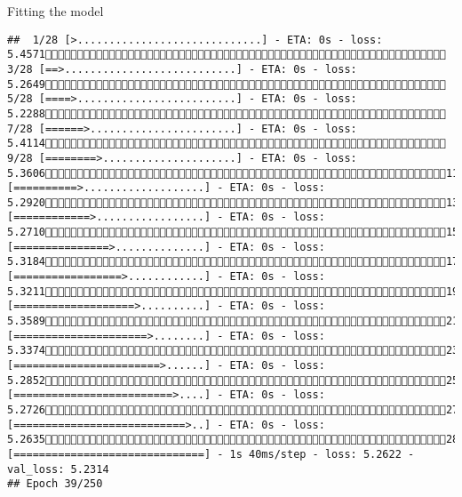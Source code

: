 \documentclass[
  ignorenonframetext,
]{beamer}
\begin{document}
\begin{frame}[fragile]{Fitting the model}
\begin{verbatim}
##  1/28 [>.............................] - ETA: 0s - loss: 5.4571 3/28 [==>...........................] - ETA: 0s - loss: 5.2649 5/28 [====>.........................] - ETA: 0s - loss: 5.2288 7/28 [======>.......................] - ETA: 0s - loss: 5.4114 9/28 [========>.....................] - ETA: 0s - loss: 5.360611/28 [==========>...................] - ETA: 0s - loss: 5.292013/28 [============>.................] - ETA: 0s - loss: 5.271015/28 [===============>..............] - ETA: 0s - loss: 5.318417/28 [=================>............] - ETA: 0s - loss: 5.321119/28 [===================>..........] - ETA: 0s - loss: 5.358921/28 [=====================>........] - ETA: 0s - loss: 5.337423/28 [=======================>......] - ETA: 0s - loss: 5.285225/28 [=========================>....] - ETA: 0s - loss: 5.272627/28 [===========================>..] - ETA: 0s - loss: 5.263528/28 [==============================] - 1s 40ms/step - loss: 5.2622 - val_loss: 5.2314
## Epoch 39/250

\end{verbatim}
\end{frame}
\end{document}

